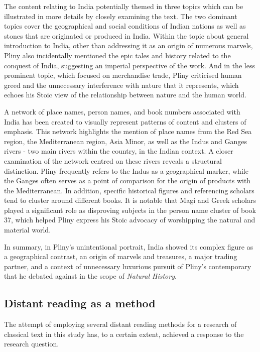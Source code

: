 \documentclass[
  12pt,
]{article}
\begin{document}
The content relating to India potentially themed in three topics which
can be illustrated in more details by closely examining the text. The
two dominant topics cover the geographical and social conditions of
Indian nations as well as stones that are originated or produced in
India. Within the topic about general introduction to India, other than
addressing it as an origin of numerous marvels, Pliny also incidentally
mentioned the epic tales and history related to the conquest of India,
suggesting an imperial perspective of the work. And in the less
prominent topic, which focused on merchandise trade, Pliny criticised
human greed and the unnecessary interference with nature that it
represents, which echoes his Stoic view of the relationship between
nature and the human world.

A network of place names, person names, and book numbers associated with
India has been created to visually represent patterns of content and
clusters of emphasis. This network highlights the mention of place names
from the Red Sea region, the Mediterranean region, Asia Minor, as well
as the Indus and Ganges rivers - two main rivers within the country, in
the Indian context. A closer examination of the network centred on these
rivers reveals a structural distinction. Pliny frequently refers to the
Indus as a geographical marker, while the Ganges often serves as a point
of comparison for the origin of products with the Mediterranean. In
addition, specific historical figures and referencing scholars tend to
cluster around different books. It is notable that Magi and Greek
scholars played a significant role as disproving subjects in the person
name cluster of book 37, which helped Pliny express his Stoic advocacy
of worshipping the natural and material world.

In summary, in Pliny's unintentional portrait, India showed its complex
figure as a geographical contrast, an origin of marvels and treasures, a
major trading partner, and a context of unnecessary luxurious pursuit of
Pliny's contemporary that he debated against in the scope of
\emph{Natural History}.

\hypertarget{distant-reading-as-a-method}{%
\subsection{Distant reading as a
method}\label{distant-reading-as-a-method}}

The attempt of employing several distant reading methods for a research
of classical text in this study has, to a certain extent, achieved a
response to the research question.
\end{document}

